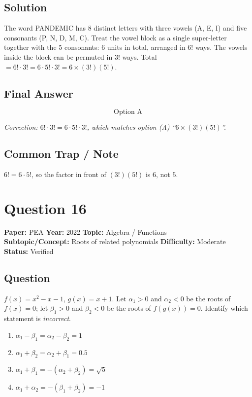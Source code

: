 \documentclass[11pt]{article}
\begin{document}
\subsection*{Solution}
The word PANDEMIC has $8$ distinct letters with three vowels (A, E, I) and five consonants
(P, N, D, M, C). Treat the vowel block as a single super-letter together with the $5$ consonants:
$6$ units in total, arranged in $6!$ ways. The vowels inside the block can be permuted in $3!$ ways.
Total $= 6! \cdot 3! = 6 \cdot 5! \cdot 3! = 6 \times (3!)(5!)$.

\subsection*{Final Answer}
\[
\boxed{\text{Option A}}
\]

\textit{Correction: $6! \cdot 3! = 6 \cdot 5! \cdot 3!$, which matches option (A) ``$6 \times (3!)(5!)$''.}

\subsection*{Common Trap / Note}
$6! = 6 \cdot 5!$, so the factor in front of $(3!)(5!)$ is $6$, not $5$.

\section*{Question 16}
\textbf{Paper:} PEA \quad \textbf{Year:} 2022 \quad \textbf{Topic:} Algebra / Functions \\
\textbf{Subtopic/Concept:} Roots of related polynomials \quad \textbf{Difficulty:} Moderate \\
\textbf{Status:} Verified

\subsection*{Question}
$f(x) = x^2 - x - 1$, $g(x) = x + 1$. Let $\alpha_1 > 0$ and $\alpha_2 < 0$ be the roots of $f(x)=0$;
let $\beta_1 > 0$ and $\beta_2 < 0$ be the roots of $f(g(x))=0$. Identify which statement is
\emph{incorrect}.
\begin{enumerate}[label=(\Alph*)]
\item $\alpha_1 - \beta_1 = \alpha_2 - \beta_2 = 1$
\item $\alpha_1 + \beta_2 = \alpha_2 + \beta_1 = 0.5$  \quad [as printed]
\item $\alpha_1 + \beta_1 = -(\alpha_2 + \beta_2) = \sqrt 5$
\item $\alpha_1 + \alpha_2 = -(\beta_1 + \beta_2) = -1$
\end{enumerate}
\end{document}
